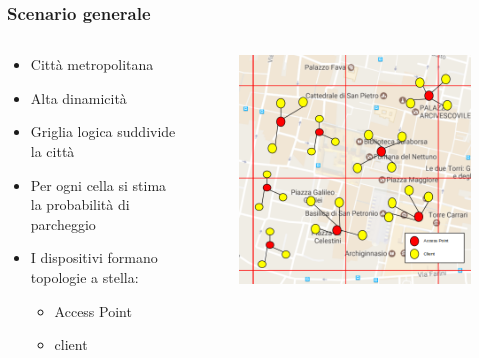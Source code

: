 \documentclass{beamer}
\begin{document}
\begin{frame}
  \frametitle{Scenario generale}
  \begin{columns}
    \begin{column}{0.6\textwidth}
      \begin{itemize}
	\item Città metropolitana
	\item Alta dinamicità
	\item Griglia logica suddivide la città
	\item Per ogni cella si stima la probabilità di parcheggio
	\item I dispositivi formano topologie a stella:
	\begin{itemize}
	  \item Access Point
	  \item client
	\end{itemize}
      \end{itemize}
    \end{column}

    \begin{column}{0.4\textwidth}
      \begin{figure}
	\raggedleft
	\includegraphics[width=\columnwidth]{img/arch_general.png}
      \end{figure}
    \end{column}
  \end{columns}
\end{frame}
\end{document}
